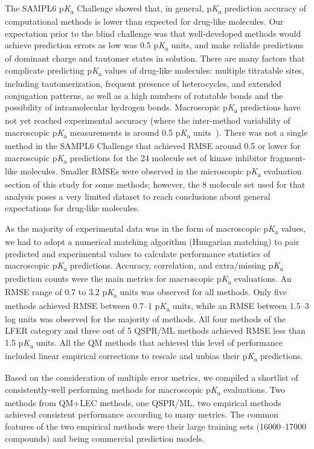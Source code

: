 \documentclass[9pt,lineno,final]{elife}
\newcommand{\pKa}{p\textit{K}\textsubscript{a}}
\begin{document}
The SAMPL6 \pKa{} Challenge showed that, in general, \pKa{} prediction accuracy of computational methods is lower than expected for drug-like molecules. 
Our expectation prior to the blind challenge was that well-developed methods would achieve prediction errors as low was 0.5 \pKa{} units, and make reliable predictions of dominant charge and tautomer states in solution. 
There are many factors that complicate predicting \pKa{} values of drug-like molecules: multiple titratable sites, including tautomerization, frequent presence of heterocycles, and extended conjugation patterns, as well as a high numbers of rotatable bonds and the possibility of intramolecular hydrogen bonds.
Macroscopic \pKa{} predictions have not yet reached experimental accuracy (where the inter-method variability of macroscopic \pKa{} measurements is around 0.5 \pKa{} units~\citep{Fraczkiewicz:2013:ReferenceModuleinChemistryMolecularSciencesandChemicalEngineering}). 
There was not a single method in the SAMPL6 Challenge that achieved RMSE around 0.5 or lower for macroscopic \pKa{} predictions for the 24 molecule set of kinase inhibitor fragment-like molecules.
Smaller RMSEs were observed in the microscopic \pKa{} evaluation section of this study for some methods; however, the 8 molecule set used for that analysis poses a very limited dataset to reach conclusions about general expectations for drug-like molecules.

As the majority of experimental data was in the form of macroscopic \pKa{} values, we had to adopt a numerical matching algorithm (Hungarian matching) to pair predicted and experimental values to calculate performance statistics of macroscopic \pKa{} predictions. 
Accuracy, correlation, and extra/missing \pKa{} prediction counts were the main metrics for macroscopic \pKa{} evaluations. 
An RMSE range of 0.7 to 3.2 \pKa{} units was observed for all methods.
Only five methods achieved RMSE between 0.7--1 \pKa{} units, while an RMSE between 1.5--3 log units was observed for the majority of methods. 
All four methods of the LFER category and three out of 5 QSPR/ML methods achieved RMSE less than 1.5 \pKa{} units.
All the QM methods that achieved this level of performance included linear empirical corrections to rescale and unbias their \pKa{} predictions. 

Based on the consideration of multiple error metrics, we compiled a shortlist of consistently-well performing methods for macroscopic \pKa{} evaluations. 
Two methods from QM+LEC methods, one QSPR/ML, two empirical methods achieved consistent performance according to many metrics. 
The common features of the two empirical methods were their large training sets (16000--17000 compounds) and being commercial prediction models.
\end{document}
